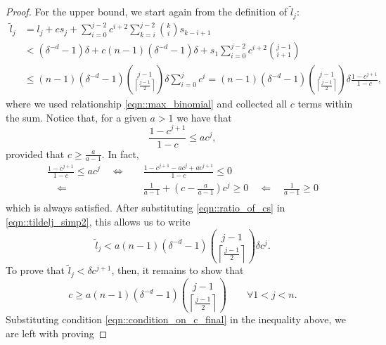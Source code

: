 \begin{proof}
    For the upper bound, we start again from the definition of $\tilde{l}_j$:
    \begin{equation}
    \begin{split}
        \tilde{l}_{j} &= l_{j} + cs_{j} +\sum_{i=0}^{j-2}c^{i+2}\sum_{k=i}^{j-2}\binom{k}{i}s_{k-i+1}\\
            &<    (\delta^{-d}-1)\delta + c(n-1)(\delta^{-d}-1)\delta + s_1\sum_{i=0}^{j-2}c^{i+2}\binom{j-1}{i+1}\\
            &\leq (n-1)(\delta^{-d}-1)\binom{j-1}{\left\lceil\frac{j-1}{2}\right\rceil}\delta \sum_{i=0}^{j}c^{i}
            = (n-1)(\delta^{-d}-1)\binom{j-1}{\left\lceil\frac{j-1}{2}\right\rceil}\delta \frac{1-c^{j+1}}{1-c},
    \end{split}
    \label{eqn::tildelj_simp2}
    \end{equation}   
    where we used relationship \cref{eqn::max_binomial} and collected all $c$ terms within the sum. Notice that, for a given $a>1$ we have that
    \begin{equation}
        \frac{1-c^{j+1}}{1-c}\leq ac^{j},
        \label{eqn::ratio_of_cs}
    \end{equation}
    provided that $c\geq\frac{a}{a-1}$. In fact,
    \begin{equation}
    \begin{split}
        \frac{1-c^{j+1}}{1-c} \leq ac^{j} \quad\Longleftrightarrow\quad& \frac{1-c^{j+1}-ac^{j}+ac^{j+1}}{1-c} \leq 0 \\
        \quad\Longleftarrow\quad& \frac{1}{a-1}+\left(c-\frac{a}{a-1}\right)c^{j} \geq 0
        \quad\Longleftarrow\quad \frac{1}{a-1} \geq 0\\
    \end{split}
    \end{equation}
    which is always satisfied. After substituting \cref{eqn::ratio_of_cs} in \cref{eqn::tildelj_simp2}, this allows us to write
    \begin{equation}
        \tilde{l}_{j} < a(n-1)(\delta^{-d}-1)\binom{j-1}{\left\lceil\frac{j-1}{2}\right\rceil}\delta c^{j}.
    \end{equation}   
    To prove that $\tilde{l}_{j}<\delta c^{j+1}$, then, it remains to show that
    \begin{equation}
        c \geq a(n-1)(\delta^{-d}-1)\binom{j-1}{\left\lceil\frac{j-1}{2}\right\rceil}\qquad\forall 1<j<n.
    \end{equation}   
    Substituting condition \cref{eqn::condition_on_c_final} in the inequality above, we are left with proving

\end{proof}
